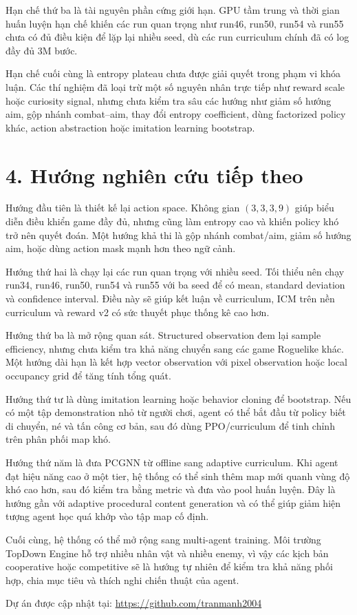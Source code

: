 Hạn chế thứ ba là tài nguyên phần cứng giới hạn. GPU tầm trung và thời gian huấn luyện hạn chế khiến các run quan trọng như run46, run50, run54 và run55 chưa có đủ điều kiện để lặp lại nhiều seed, dù các run curriculum chính đã có log đầy đủ 3M bước.

Hạn chế cuối cùng là entropy plateau chưa được giải quyết trong phạm vi khóa luận. Các thí nghiệm đã loại trừ một số nguyên nhân trực tiếp như reward scale hoặc curiosity signal, nhưng chưa kiểm tra sâu các hướng như giảm số hướng aim, gộp nhánh combat--aim, thay đổi entropy coefficient, dùng factorized policy khác, action abstraction hoặc imitation learning bootstrap.

\section*{4. Hướng nghiên cứu tiếp theo}

Hướng đầu tiên là thiết kế lại action space. Không gian $(3,3,3,9)$ giúp biểu diễn điều khiển game đầy đủ, nhưng cũng làm entropy cao và khiến policy khó trở nên quyết đoán. Một hướng khả thi là gộp nhánh combat/aim, giảm số hướng aim, hoặc dùng action mask mạnh hơn theo ngữ cảnh.

Hướng thứ hai là chạy lại các run quan trọng với nhiều seed. Tối thiểu nên chạy run34, run46, run50, run54 và run55 với ba seed để có mean, standard deviation và confidence interval. Điều này sẽ giúp kết luận về curriculum, ICM trên nền curriculum và reward v2 có sức thuyết phục thống kê cao hơn.

Hướng thứ ba là mở rộng quan sát. Structured observation đem lại sample efficiency, nhưng chưa kiểm tra khả năng chuyển sang các game Roguelike khác. Một hướng dài hạn là kết hợp vector observation với pixel observation hoặc local occupancy grid để tăng tính tổng quát.

Hướng thứ tư là dùng imitation learning hoặc behavior cloning để bootstrap. Nếu có một tập demonstration nhỏ từ người chơi, agent có thể bắt đầu từ policy biết di chuyển, né và tấn công cơ bản, sau đó dùng PPO/curriculum để tinh chỉnh trên phân phối map khó.

Hướng thứ năm là đưa PCGNN từ offline sang adaptive curriculum. Khi agent đạt hiệu năng cao ở một tier, hệ thống có thể sinh thêm map mới quanh vùng độ khó cao hơn, sau đó kiểm tra bằng metric và đưa vào pool huấn luyện. Đây là hướng gần với adaptive procedural content generation và có thể giúp giảm hiện tượng agent học quá khớp vào tập map cố định.

Cuối cùng, hệ thống có thể mở rộng sang multi-agent training. Môi trường TopDown Engine hỗ trợ nhiều nhân vật và nhiều enemy, vì vậy các kịch bản cooperative hoặc competitive sẽ là hướng tự nhiên để kiểm tra khả năng phối hợp, chia mục tiêu và thích nghi chiến thuật của agent.

Dự án được cập nhật tại:
\url{https://github.com/tranmanh2004}
